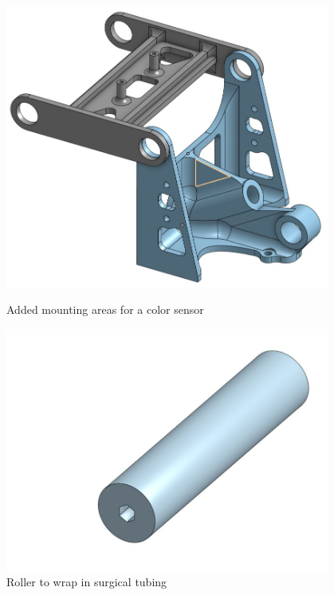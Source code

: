 \begin{figure}[ht]
\centering
\begin{minipage}[b]{.48\textwidth}
  \centering
  \includegraphics[width=0.95\textwidth]{Meetings/November/11-22-21/11-22-21_CAD_Figure1 - Nathan Forrer.JPG}
  \caption{Added mounting areas for a color sensor}
  \label{fig:112221_1}
\end{minipage}%
\hfill%
\begin{minipage}[b]{.48\textwidth}
  \centering
  \includegraphics[width=0.95\textwidth]{Meetings/November/11-22-21/11-22-21_CAD_Figure2 - Nathan Forrer.JPG}
  \caption{Roller to wrap in surgical tubing}
  \label{fig:112221_2}
\end{minipage}
\end{figure}

